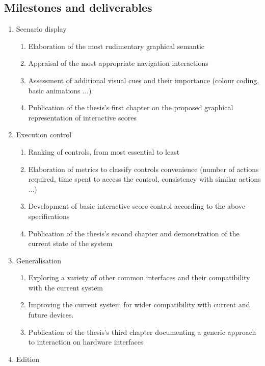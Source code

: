 \documentclass[journal,onecolumn]{IEEEtran}
\begin{document}
\subsection{Milestones and deliverables}
\renewcommand{\theenumi}{M.\arabic{enumi}}
\renewcommand{\theenumii}{d.\arabic{enumi}.\arabic{enumii}}
\begin{enumerate}
    \item Scenario display
    \begin{enumerate}
        \item Elaboration of the most rudimentary graphical semantic
        \item Appraisal of the most appropriate navigation interactions
        \item Assessment of additional visual cues and their importance (colour coding, basic animations ...)
        \item Publication of the thesis's first chapter on the proposed graphical representation of interactive scores
    \end{enumerate}
    \item Execution control
    \begin{enumerate}
        \item Ranking of controls, from most essential to least
        \item Elaboration of metrics to classify controls convenience (number of actions required, time spent to access the control, consistency with similar actions ...)
        \item Development of basic interactive score control according to the above specifications
        \item Publication of the thesis's second chapter and demonstration of the current state of the system
    \end{enumerate}
    \item Generalisation
    \begin{enumerate}
        \item Exploring a variety of other common interfaces and their compatibility with the current system
        \item Improving the current system for wider compatibility with current and future devices.
        \item Publication of the thesis's third chapter documenting a generic approach to interaction on hardware interfaces
    \end{enumerate}
    \item Edition
    \begin{enumerate}

\end{enumerate}
\end{enumerate}
\end{document}
